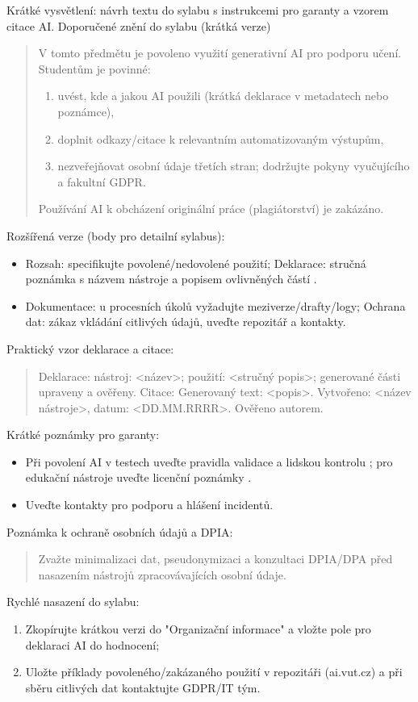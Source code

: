 Krátké vysvětlení: návrh textu do sylabu s instrukcemi pro garanty a vzorem citace AI.
Doporučené znění do sylabu (krátká verze)
\begin{quote}
V tomto předmětu je povoleno využití generativní AI pro podporu učení. Studentům je povinné:
\begin{enumerate}
\item uvést, kde a jakou AI použili (krátká deklarace v metadatech nebo poznámce),
\item doplnit odkazy/citace k relevantním automatizovaným výstupům,
\item nezveřejňovat osobní údaje třetích stran; dodržujte pokyny vyučujícího a fakultní GDPR.
\end{enumerate}
Používání AI k obcházení originální práce (plagiátorství) je zakázáno.
\end{quote}

Rozšířená verze (body pro detailní sylabus): \begin{itemize}
\item Rozsah: specifikujte povolené/nedovolené použití; Deklarace: stručná poznámka s názvem nástroje a popisem ovlivněných částí \cite{kb_ai_101_tipu_pdf_04e4a115_page_36_1}.
\item Dokumentace: u procesních úkolů vyžadujte meziverze/drafty/logy; Ochrana dat: zákaz vkládání citlivých údajů, uveďte repozitář a kontakty.
\end{itemize}

Praktický vzor deklarace a citace: \begin{quote}Deklarace: nástroj: <název>; použití: <stručný popis>; generované části upraveny a ověřeny. Citace: Generovaný text: <popis>. Vytvořeno: <název nástroje>, datum: <DD.MM.RRRR>. Ověřeno autorem.\end{quote}

Krátké poznámky pro garanty: \begin{itemize}
\item Při povolení AI v testech uveďte pravidla validace a lidskou kontrolu \cite{kb_ai_101_tipu_pdf_04e4a115_page_36_1}; pro edukační nástroje uveďte licenční poznámky \cite{kb_ai_101_tipu_pdf_04e4a115_page_15_2}.
\item Uveďte kontakty pro podporu a hlášení incidentů.
\end{itemize}

Poznámka k ochraně osobních údajů a DPIA: \begin{quote}Zvažte minimalizaci dat, pseudonymizaci a konzultaci DPIA/DPA před nasazením nástrojů zpracovávajících osobní údaje.\end{quote}

Rychlé nasazení do sylabu: \begin{enumerate}\item Zkopírujte krátkou verzi do "Organizační informace" a vložte pole pro deklaraci AI do hodnocení; \item Uložte příklady povoleného/zakázaného použití v repozitáři (ai.vut.cz) a při sběru citlivých dat kontaktujte GDPR/IT tým.\end{enumerate}